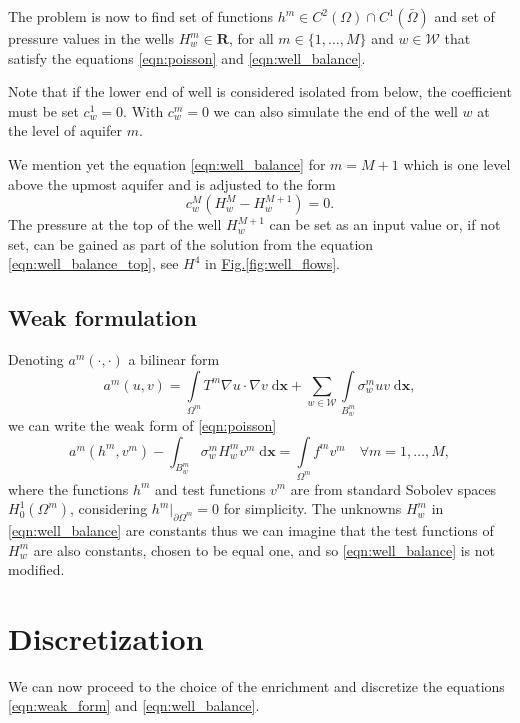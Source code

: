 \documentclass[preprint,12pt,authoryear]{elsarticle}
\newcommand{\fig}[1]{\hyperref[#1]{Fig.\ref{#1}}}
\newcommand{\dd}{\; \mathrm{d}}
\newcommand{\R}{\mathbf{R}}
\newcommand{\bx}{\mathbf{x}}
\begin{document}
The problem is now to find set of functions $h^m\in C^2(\Omega)\cap{C}^1(\bar\Omega)$ and set of pressure 
values in the wells $H^m_w\in\R$, for all $m\in\{1,\ldots,M\}$ and $w\in\mathcal{W}$ that
satisfy the equations \eqref{eqn:poisson} and \eqref{eqn:well_balance}.

Note that if the lower end of well is considered isolated from below, the coefficient must be set $c^1_w = 0$.
With $c^m_w = 0$ we can also simulate the end of the well $w$ at the level of aquifer $m$.

We mention yet the equation \eqref{eqn:well_balance} for $m=M+1$ which is one level above the upmost aquifer
and is adjusted to the form
\begin{equation} \label{eqn:well_balance_top}
  c^M_w\left( H^{M}_w-H^{M+1}_w \right) = 0.
\end{equation}
The pressure at the top of the well $H^{M+1}_w$ can be set as an input value or, if not set, can be gained 
as part of the solution from the equation \eqref{eqn:well_balance_top}, see $H^4$ in \fig{fig:well_flows}.

\subsection{Weak formulation}
Denoting $a^m(\cdot, \cdot)$ a bilinear form 
\begin{equation} \label{eqn:bilinear_form_a}
  a^m(u,v) = \int \limits_{\Omega^m} T^m \nabla u \cdot \nabla v \dd\bx
        + \sum \limits_{w\in \mathcal{W}} \int \limits_{B^m_w} \sigma^m_w u v \dd\bx,
\end{equation}
we can write the weak form of \eqref{eqn:poisson}
\begin{equation} \label{eqn:weak_form}
  a^m(h^m,v^m) - \int_{B_w^m}\sigma_w^m H_w^m v^m \dd\bx
  = \int \limits_{\Omega^m} f^mv^m%
  \quad \forall m=1,\ldots,M,
\end{equation}
where the functions $h^m$ and test functions $v^m$ are from standard Sobolev spaces $H^1_0(\Omega^m)$,
considering $h^m|_{\partial\Omega^m}=0$ for simplicity.
The unknowns $H^m_w$ in \eqref{eqn:well_balance} are constants thus we can imagine that the test functions of 
$H^m_w$ are also constants, chosen to be equal one, and so \eqref{eqn:well_balance} is not modified.

\section{Discretization}
\label{sec:pum_methods}
We can now proceed to the choice of the enrichment and discretize the equations
\eqref{eqn:weak_form} and \eqref{eqn:well_balance}.
\end{document}

